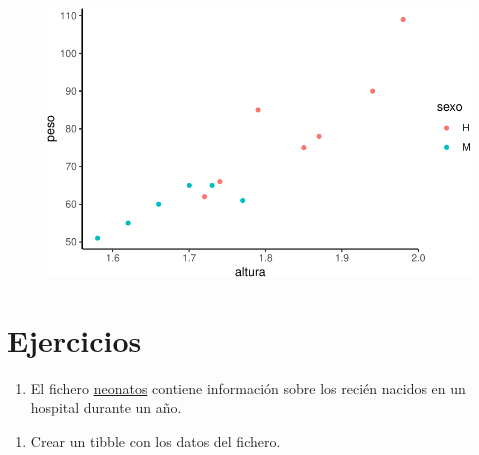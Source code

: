 \documentclass[
  a4paper,
]{scrreport}
\providecommand{\tightlist}{%
  \setlength{\itemsep}{0pt}\setlength{\parskip}{0pt}}\usepackage{longtable,booktabs,array}
\theoremstyle{definition}
\theoremstyle{definition}
\theoremstyle{remark}
\begin{document}
\begin{figure}[H]

{\centering \includegraphics{./07-graficos_files/figure-pdf/unnamed-chunk-32-1.pdf}

}

\end{figure}

\hypertarget{ejercicios-4}{%
\section{Ejercicios}\label{ejercicios-4}}

\begin{enumerate}
\def\labelenumi{\arabic{enumi}.}
\tightlist
\item
  El fichero
  \href{https://raw.githubusercontent.com/asalber/manual-r/master/datos/neonatos.csv}{neonatos}
  contiene información sobre los recién nacidos en un hospital durante
  un año.
\end{enumerate}

\begin{enumerate}
\def\labelenumi{\alph{enumi}.}
\tightlist
\item
  Crear un tibble con los datos del fichero.
\end{enumerate}
\end{document}

